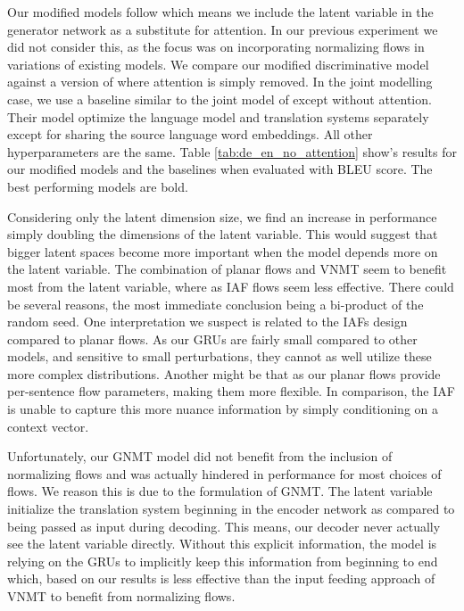 Our modified models follow \citet{bahdanau2014NMTBYJoint} which means we include the latent variable in the generator network as a substitute for attention. In our previous experiment we did not consider this, as the focus was on incorporating normalizing flows in variations of existing models. We compare our modified discriminative model against a version of \citet{bahdanau2014NMTBYJoint} where attention is simply removed. In the joint modelling case, we use a baseline similar to the joint model of \citet{eikema2018AEVNMT} except without attention. Their model optimize the language model and translation systems separately except for sharing the source language word embeddings. All other hyperparameters are the same. Table \ref{tab:de_en_no_attention} show's results for our modified models and the baselines when evaluated with BLEU score. The best performing models are bold.

Considering only the latent dimension size, we find an increase in performance simply doubling the dimensions of the latent variable. This would suggest that bigger latent spaces become more important when the model depends more on the latent variable. The combination of planar flows and \ac{VNMT} seem to benefit most from the latent variable, where as \ac{IAF} flows seem less effective. There could be several reasons, the most immediate conclusion being a bi-product of the random seed. One interpretation we suspect is related to the \ac{IAF}s design compared to planar flows. As our \ac{GRU}s are fairly small compared to other models, and sensitive to small perturbations, they cannot as well utilize these more complex distributions. Another might be that as our planar flows provide per-sentence flow parameters, making them more flexible. In comparison, the \ac{IAF} is unable to capture this more nuance information by simply conditioning on a context vector. 

 Unfortunately, our \ac{GNMT} model did not benefit from the inclusion of normalizing flows and was actually hindered in performance for most choices of flows. We reason this is due to the formulation of \ac{GNMT}. The latent variable initialize the translation system beginning in the encoder network as compared to being passed as input during decoding. This means, our decoder never actually see the latent variable directly. Without this explicit information, the model is relying on the \ac{GRU}s to implicitly keep this information from beginning to end which, based on our results is less effective than the input feeding approach of \ac{VNMT} to benefit from normalizing flows. 


